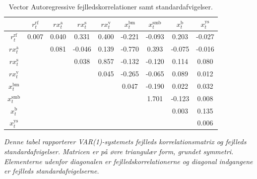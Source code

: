 \documentclass[
  a4paper,
  oneside]{memoir}
\begin{document}
\begin{table}[H]

\caption{\label{tab:COV-RES-TAB}Vector Autoregressive fejlledskorrelationer samt standardafvigelser.}
\centering
\begin{threeparttable}
\begin{tabular}[t]{ccccccccc}
\toprule
  & $r_t^{\text{rf}}$ & $rx_t^{\text{a}}$ & $rx_t^{\text{s}}$ & $rx_t^{\text{v}}$ & $x_t^{\text{bm}}$ & $x_t^{\text{smb}}$ & $x_t^{\text{b}}$ & $x_t^{\text{ys}}$\\
\midrule
\rowcolor{gray!6}  $r_t^{\text{rf}}$ & 0.007 & 0.040 & 0.331 & 0.400 & -0.221 & -0.093 & 0.203 & -0.027\\
 
$rx_t^{\text{a}}$ &  & 0.081 & -0.046 & 0.139 & -0.770 & 0.393 & -0.075 & -0.016\\
 
\rowcolor{gray!6}  $rx_t^{\text{s}}$ &  &  & 0.038 & 0.857 & -0.132 & -0.120 & 0.114 & 0.080\\
 
$rx_t^{\text{v}}$ &  &  &  & 0.045 & -0.265 & -0.065 & 0.089 & 0.012\\
 
\rowcolor{gray!6}  $x_t^{\text{bm}}$ &  &  &  &  & 0.047 & -0.190 & 0.022 & 0.032\\
 
$x_t^{\text{smb}}$ &  &  &  &  &  & 1.701 & -0.123 & 0.008\\
 
\rowcolor{gray!6}  $x_t^{\text{b}}$ &  &  &  &  &  &  & 0.003 & 0.135\\
 
$x_t^{\text{ys}}$ &  &  &  &  &  &  &  & 0.006\\
\bottomrule
\end{tabular}
\begin{tablenotes}
\item \textit{Denne tabel rapporterer VAR(1)-systemets fejlleds korrelationsmatrix og fejlleds standardafvigelser. Matricen er på øvre triangulær form, grundet symmetri. Elementerne udenfor diagonalen er fejlledskorrelationerne og diagonal indgangene er fejlleds standardafvigelserne.}
\end{tablenotes}
\end{threeparttable}
\end{table}
\end{document}
